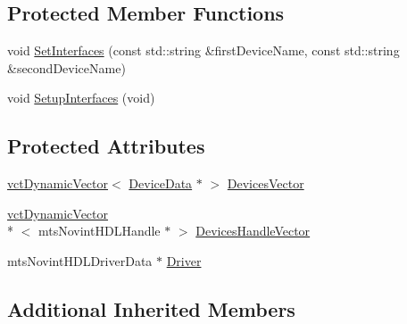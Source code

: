 \subsection*{Protected Member Functions}
\begin{DoxyCompactItemize}
\item 
void \hyperlink{classmts_novint_h_d_l_ac1a5cba2d5b5b9f14de1333e740fb493}{Set\-Interfaces} (const std\-::string \&first\-Device\-Name, const std\-::string \&second\-Device\-Name)
\item 
void \hyperlink{classmts_novint_h_d_l_a610204e77405d6c1e116359390aaacff}{Setup\-Interfaces} (void)
\end{DoxyCompactItemize}
\subsection*{Protected Attributes}
\begin{DoxyCompactItemize}
\item 
\hyperlink{classvct_dynamic_vector}{vct\-Dynamic\-Vector}$<$ \hyperlink{structmts_novint_h_d_l_1_1_device_data}{Device\-Data} $\ast$ $>$ \hyperlink{classmts_novint_h_d_l_a7f19ef6b35fd78933bb09d8adeedf986}{Devices\-Vector}
\item 
\hyperlink{classvct_dynamic_vector}{vct\-Dynamic\-Vector}\\*
$<$ mts\-Novint\-H\-D\-L\-Handle $\ast$ $>$ \hyperlink{classmts_novint_h_d_l_a63c863bb97b427554c3647a1bfc5cbca}{Devices\-Handle\-Vector}
\item 
mts\-Novint\-H\-D\-L\-Driver\-Data $\ast$ \hyperlink{classmts_novint_h_d_l_a8eeac12be5c50e55c932e88fea791632}{Driver}
\end{DoxyCompactItemize}
\subsection*{Additional Inherited Members}


